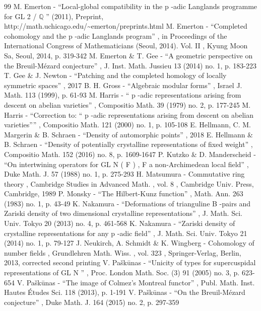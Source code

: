 \documentclass[11pt]{article}
\theoremstyle{definition}
\begin{document}
\begin{thebibliography}{99}
 M. Emerton - “Local-global compatibility in the p -adic Langlands programme for GL 2 / \(\mathbb Q\) ” (2011), Preprint, http://math.uchicago.edu/\textasciitilde{}emerton/preprints.html
 M. Emerton - “Completed cohomology and the p -adic Langlands program” , in Proceedings of the International Congress of Mathematicians (Seoul, 2014). Vol. II , Kyung Moon Sa, Seoul, 2014, p. 319-342
 M. Emerton \& T. Gee - “A geometric perspective on the Breuil-Mézard conjecture” , J. Inst. Math. Jussieu 13 (2014) no. 1, p. 183-223
 T. Gee \& J. Newton - “Patching and the completed homology of locally symmetric spaces” , 2017
 B. H. Gross - “Algebraic modular forms” , Israel J. Math. 113 (1999), p. 61-93
 M. Harris - “ p -adic representations arising from descent on abelian varieties” , Compositio Math. 39 (1979) no. 2, p. 177-245
 M. Harris - “Correction to: “ p -adic representations arising from descent on abelian varieties”” , Compositio Math. 121 (2000) no. 1, p. 105-108
 E. Hellmann, C. M. Margerin \& B. Schraen - “Density of automorphic points” , 2018
 E. Hellmann \& B. Schraen - “Density of potentially crystalline representations of fixed weight” , Compositio Math. 152 (2016) no. 8, p. 1609-1647
 P. Kutzko \& D. Manderscheid - “On intertwining operators for GL N ( F ) , F a non-Archimedean local field” , Duke Math. J. 57 (1988) no. 1, p. 275-293
 H. Matsumura - Commutative ring theory , Cambridge Studies in Advanced Math. , vol. 8 , Cambridge Univ. Press, Cambridge, 1989
 P. Monsky - “The Hilbert-Kunz function” , Math. Ann. 263 (1983) no. 1, p. 43-49
 K. Nakamura - “Deformations of trianguline B -pairs and Zariski density of two dimensional crystalline representations” , J. Math. Sci. Univ. Tokyo 20 (2013) no. 4, p. 461-568
 K. Nakamura - “Zariski density of crystalline representations for any p -adic field” , J. Math. Sci. Univ. Tokyo 21 (2014) no. 1, p. 79-127
 J. Neukirch, A. Schmidt \& K. Wingberg - Cohomology of number fields , Grundlehren Math. Wiss. , vol. 323 , Springer-Verlag, Berlin, 2013, corrected second printing
 V. Paškūnas - “Unicity of types for supercuspidal representations of GL N ” , Proc. London Math. Soc. (3) 91 (2005) no. 3, p. 623-654
 V. Paškūnas - “The image of Colmez’s Montreal functor” , Publ. Math. Inst. Hautes Études Sci. 118 (2013), p. 1-191
 V. Paškūnas - “On the Breuil-Mézard conjecture” , Duke Math. J. 164 (2015) no. 2, p. 297-359

\end{thebibliography}
\end{document}
